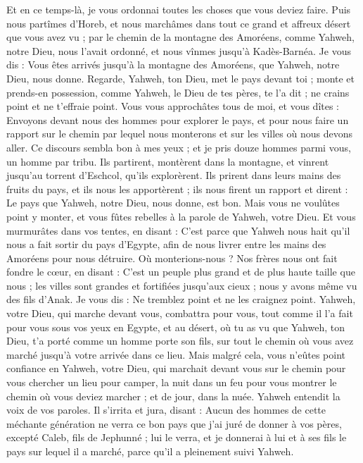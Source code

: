 \begin{multicols}{2}
Et en ce temps-là, je vous ordonnai toutes les choses que vous deviez faire.
Puis nous partîmes d'Horeb, et nous marchâmes dans tout ce grand et affreux désert que vous avez vu ; par le chemin de la montagne des Amoréens, comme Yahweh, notre Dieu, nous l’avait ordonné, et nous vînmes jusqu'à Kadès-Barnéa.
Je vous dis : Vous êtes arrivés jusqu'à la montagne des Amoréens, que Yahweh, notre Dieu, nous donne.
Regarde, Yahweh, ton Dieu, met le pays devant toi ; monte et prends-en possession, comme Yahweh, le Dieu de tes pères, te l’a dit ; ne crains point et ne t'effraie point.
Vous vous approchâtes tous de moi, et vous dîtes : Envoyons devant nous des hommes pour explorer le pays, et pour nous faire un rapport sur le chemin par lequel nous monterons et sur les villes où nous devons aller.
Ce discours sembla bon à mes yeux ; et je pris douze hommes parmi vous, un homme par tribu.
Ils partirent, montèrent dans la montagne, et vinrent jusqu'au torrent d'Eschcol, qu’ils explorèrent.
Ils prirent dans leurs mains des fruits du pays, et ils nous les apportèrent ; ils nous firent un rapport et dirent : Le pays que Yahweh, notre Dieu, nous donne, est bon.
Mais vous ne voulûtes point y monter, et vous fûtes rebelles à la parole de Yahweh, votre Dieu.
Et vous murmurâtes dans vos tentes, en disant : C’est parce que Yahweh nous hait qu’il nous a fait sortir du pays d'Egypte, afin de nous livrer entre les mains des Amoréens pour nous détruire.
Où monterions-nous ? Nos frères nous ont fait fondre le cœur, en disant : C’est un peuple plus grand et de plus haute taille que nous ; les villes sont grandes et fortifiées jusqu’aux cieux ; nous y avons même vu des fils d’Anak.
Je vous dis : Ne tremblez point et ne les craignez point.
Yahweh, votre Dieu, qui marche devant vous, combattra pour vous, tout comme il l’a fait pour vous sous vos yeux en Egypte,
et au désert, où tu as vu que Yahweh, ton Dieu, t'a porté comme un homme porte son fils, sur tout le chemin où vous avez marché jusqu'à votre arrivée dans ce lieu.
Mais malgré cela, vous n’eûtes point confiance en Yahweh, votre Dieu,
qui marchait devant vous sur le chemin pour vous chercher un lieu pour camper, la nuit dans un feu pour vous montrer le chemin où vous deviez marcher ; et de jour, dans la nuée.
Yahweh entendit la voix de vos paroles. Il s’irrita et jura, disant :
Aucun des hommes de cette méchante génération ne verra ce bon pays que j'ai juré de donner à vos pères,
excepté Caleb, fils de Jephunné ; lui le verra, et je donnerai à lui et à ses fils le pays sur lequel il a marché, parce qu'il a pleinement suivi Yahweh.

\end{multicols}
